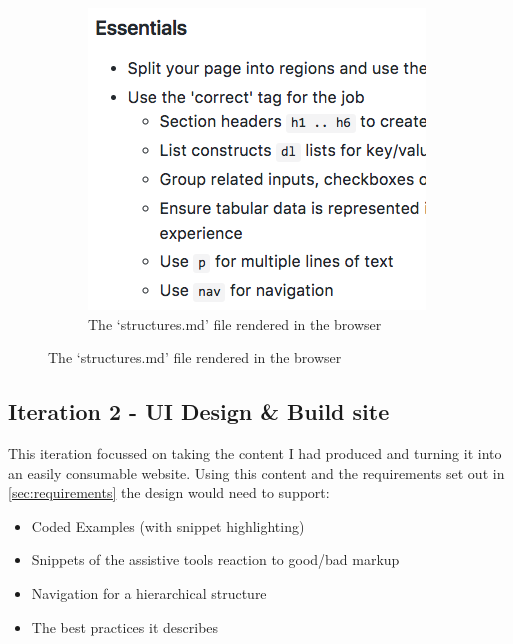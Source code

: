 \begin{figure}[H]
    \qquad
    \begin{subfigure}[b]{0.4\textwidth}
        \includegraphics[width=\textwidth]{figures/documentation_md_example_2}
        \captionsetup{justification=centering}
        \caption{The `structures.md' file rendered in the browser}
        \label{fig:structures}
    \end{subfigure}
\end{figure}

\subsection{Iteration 2 - UI Design \& Build site}
This iteration focussed on taking the content I had produced and turning it
into an easily consumable website. Using this content and the requirements set
out in \ref{sec:requirements} the design would need to support:
\begin{itemize}
\item Coded Examples (with snippet highlighting)
\item Snippets of the assistive tools reaction to good/bad markup
\item Navigation for a hierarchical structure
\item The best practices it describes
\end{itemize}

